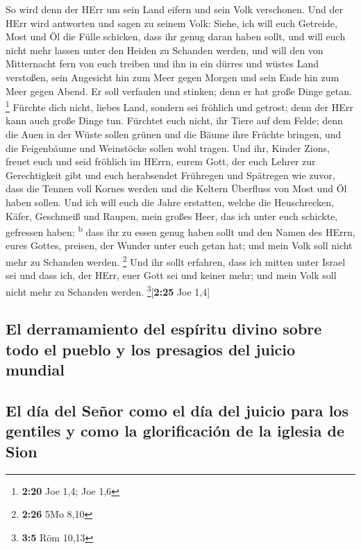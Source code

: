  So wird denn der HErr um sein Land eifern und sein Volk
verschonen.  Und der HErr wird antworten und sagen zu
seinem Volk: Siehe, ich will euch Getreide, Most und Öl die Fülle
schicken, dass ihr genug daran haben sollt, und will euch nicht mehr
lassen unter den Heiden zu Schanden werden,  und will den
von Mitternacht fern von euch treiben und ihn in ein dürres und wüstes
Land verstoßen, sein Angesicht hin zum Meer gegen Morgen und sein Ende
hin zum Meer gegen Abend. Er soll verfaulen und stinken; denn er hat
große Dinge getan. \footnote{\textbf{2:20} Joe 1,4; Joe 1,6}
 Fürchte dich nicht, liebes Land, sondern sei fröhlich
und getrost; denn der HErr kann auch große Dinge tun. 
Fürchtet euch nicht, ihr Tiere auf dem Felde; denn die Auen in der Wüste
sollen grünen und die Bäume ihre Früchte bringen, und die Feigenbäume
und Weinstöcke sollen wohl tragen.  Und ihr, Kinder
Zions, freuet euch und seid fröhlich im HErrn, eurem Gott, der euch
Lehrer zur Gerechtigkeit gibt und euch herabsendet Frühregen und
Spätregen wie zuvor,  dass die Tennen voll Kornes werden
und die Keltern Überfluss von Most und Öl haben sollen. 
Und ich will euch die Jahre erstatten, welche die Heuschrecken, Käfer,
Geschmeiß und Raupen, mein großes Heer, das ich unter euch schickte,
gefressen haben; \textsuperscript{b}  dass ihr zu essen
genug haben sollt und den Namen des HErrn, eures Gottes, preisen, der
Wunder unter euch getan hat; und mein Volk soll nicht mehr zu Schanden
werden. \footnote{\textbf{2:26} 5Mo 8,10}  Und ihr sollt
erfahren, dass ich mitten unter Israel sei und dass ich, der HErr, euer
Gott sei und keiner mehr; und mein Volk soll nicht mehr zu Schanden
werden. \footnote{\textbf{3:5} Röm 10,13}{[}\textbf{2:25} Joe 1,4{]}

\hypertarget{el-derramamiento-del-espuxedritu-divino-sobre-todo-el-pueblo-y-los-presagios-del-juicio-mundial}{%
\subsection{El derramamiento del espíritu divino sobre todo el pueblo y
los presagios del juicio
mundial}\label{el-derramamiento-del-espuxedritu-divino-sobre-todo-el-pueblo-y-los-presagios-del-juicio-mundial}}

\hypertarget{el-duxeda-del-seuxf1or-como-el-duxeda-del-juicio-para-los-gentiles-y-como-la-glorificaciuxf3n-de-la-iglesia-de-sion}{%
\subsection{El día del Señor como el día del juicio para los gentiles y
como la glorificación de la iglesia de
Sion}\label{el-duxeda-del-seuxf1or-como-el-duxeda-del-juicio-para-los-gentiles-y-como-la-glorificaciuxf3n-de-la-iglesia-de-sion}}

